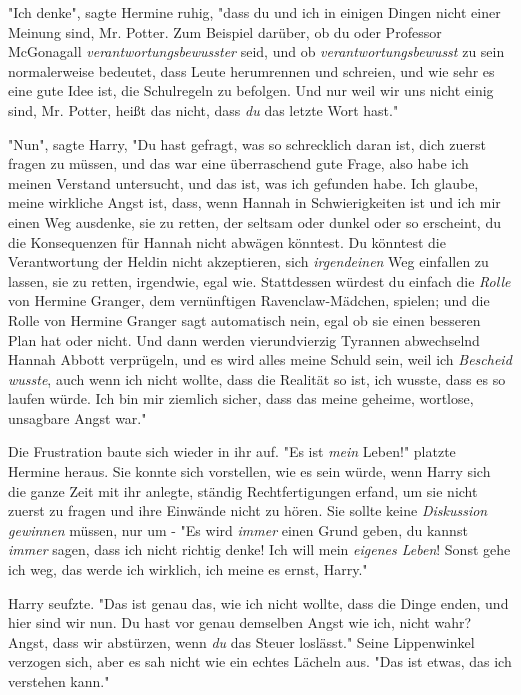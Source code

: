 {"Ich denke", sagte Hermine ruhig, "dass du und ich in einigen Dingen nicht einer Meinung sind, Mr. Potter. Zum Beispiel darüber, ob du oder Professor McGonagall \emph{verantwortungsbewusster} seid, und ob \emph{verantwortungsbewusst} zu sein normalerweise bedeutet, dass Leute herumrennen und schreien, und wie sehr es eine gute Idee ist, die Schulregeln zu befolgen. Und nur weil wir uns nicht einig sind, Mr. Potter, heißt das nicht, dass \emph{du} das letzte Wort hast."

"Nun", sagte Harry, "Du hast gefragt, was so schrecklich daran ist, dich zuerst fragen zu müssen, und das war eine überraschend gute Frage, also habe ich meinen Verstand untersucht, und das ist, was ich gefunden habe. Ich glaube, meine wirkliche Angst ist, dass, wenn Hannah in Schwierigkeiten ist und ich mir einen Weg ausdenke, sie zu retten, der seltsam oder dunkel oder so erscheint, du die Konsequenzen für Hannah nicht abwägen könntest. Du könntest die Verantwortung der Heldin nicht akzeptieren, sich \emph{irgendeinen} Weg einfallen zu lassen, sie zu retten, irgendwie, egal wie. Stattdessen würdest du einfach die \emph{Rolle} von Hermine Granger, dem vernünftigen Ravenclaw-Mädchen, spielen; und die Rolle von Hermine Granger sagt automatisch nein, egal ob sie einen besseren Plan hat oder nicht. Und dann werden vierundvierzig Tyrannen abwechselnd Hannah Abbott verprügeln, und es wird alles meine Schuld sein, weil ich \emph{Bescheid wusste}, auch wenn ich nicht wollte, dass die Realität so ist, ich wusste, dass es so laufen würde. Ich bin mir ziemlich sicher, dass das meine geheime, wortlose, unsagbare Angst war."

Die Frustration baute sich wieder in ihr auf. "Es ist \emph{mein} Leben!" platzte Hermine heraus. Sie konnte sich vorstellen, wie es sein würde, wenn Harry sich die ganze Zeit mit ihr anlegte, ständig Rechtfertigungen erfand, um sie nicht zuerst zu fragen und ihre Einwände nicht zu hören. Sie sollte keine \emph{Diskussion gewinnen} müssen, nur um - "Es wird \emph{immer} einen Grund geben, du kannst \emph{immer} sagen, dass ich nicht richtig denke! Ich will mein \emph{eigenes Leben}! Sonst gehe ich weg, das werde ich wirklich, ich meine es ernst, Harry."

Harry seufzte. "Das ist genau das, wie ich nicht wollte, dass die Dinge enden, und hier sind wir nun. Du hast vor genau demselben Angst wie ich, nicht wahr? Angst, dass wir abstürzen, wenn \emph{du} das Steuer loslässt." Seine Lippenwinkel verzogen sich, aber es sah nicht wie ein echtes Lächeln aus. "Das ist etwas, das ich verstehen kann."

}
